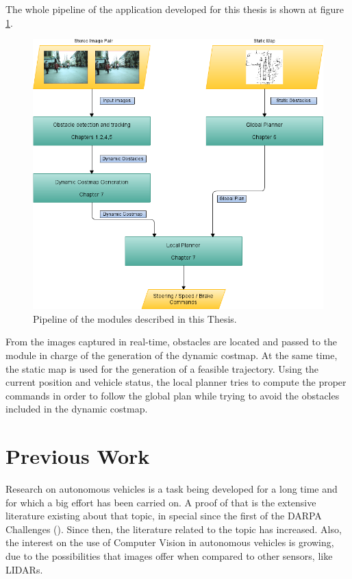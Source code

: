 The whole pipeline of the application developed for this thesis is shown at figure \ref{fig:cp00_pipeline}. 
 
\begin{figure}[thb]
  \centering
  \includegraphics{pipeline}
  \caption{Pipeline of the modules described in this Thesis.}\label{fig:cp00_pipeline}
\end{figure}

From the images captured in real-time, obstacles are located and passed to the module in charge of the generation of the dynamic costmap. At the same time, the static map is used for the generation of a feasible trajectory. Using the current position and vehicle status, the local planner tries to compute the proper commands in order to follow the global plan while trying to avoid the obstacles included in the dynamic costmap.

\section{Previous Work}\label{ch:chapter00_02}

Research on autonomous vehicles is a task being developed for a long time and for which a big effort has been carried on. A proof of that is the extensive literature existing about that topic, in special since the first of the DARPA Challenges (\cite{Buehler2007, Buehler2009}). Since then, the literature related to the topic has increased. Also, the interest on the use of Computer Vision in autonomous vehicles is growing, due to the possibilities that images offer when compared to other sensors, like \acp{LIDAR}.

